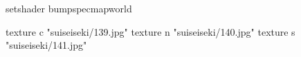 setshader bumpspecmapworld

    texture c "suiseiseki/139.jpg"
    texture n "suiseiseki/140.jpg"
    texture s "suiseiseki/141.jpg"
